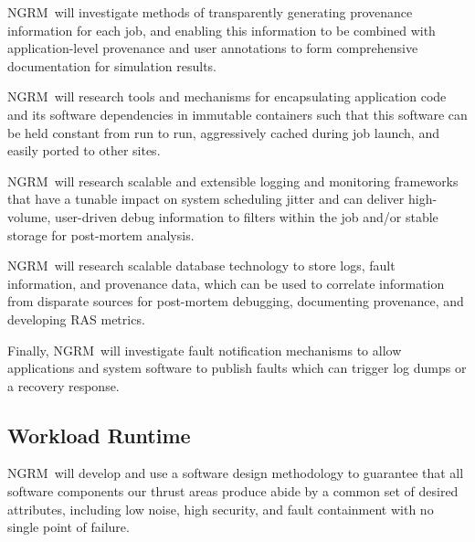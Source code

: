 \documentclass{article}
\newcommand{\ngrm}{NGRM}
\begin{document}
\ngrm\ will investigate methods of transparently generating provenance
information for each job, and enabling this information to be combined
with application-level provenance and user annotations to form
comprehensive documentation for simulation results.

\ngrm\ will research tools and mechanisms for encapsulating application
code and its software dependencies in immutable containers such that
this software can be held constant from run to run, aggressively
cached during job launch, and easily ported to other sites.

\ngrm\ will research scalable and extensible logging and monitoring
frameworks that have a tunable impact on system scheduling jitter and
can deliver high-volume, user-driven debug information to filters within
the job and/or stable storage for post-mortem analysis.

\ngrm\ will research scalable database technology to store
logs, fault information, and provenance data, which can be used
to correlate information from disparate sources for post-mortem debugging,
documenting provenance, and developing RAS metrics.

Finally, \ngrm\ will investigate fault notification mechanisms
to allow applications and system software to publish
faults which can trigger log dumps or a recovery response.


\subsection{Workload Runtime}

\ngrm\ will develop and use a software design methodology to
guarantee that all software components our thrust areas produce
abide by a common set of desired attributes, including low noise,
high security, and fault containment with no single point of failure.













\appendix









\end{document}
